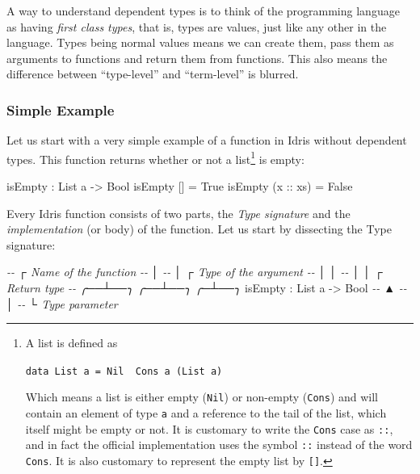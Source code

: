 \documentclass[
]{article}
\newenvironment{Shaded}{}{}
\newcommand{\CommentTok}[1]{\textcolor[rgb]{0.38,0.63,0.69}{\textit{#1}}}
\newcommand{\DataTypeTok}[1]{\textcolor[rgb]{0.56,0.13,0.00}{#1}}
\newcommand{\NormalTok}[1]{#1}
\newcommand{\OperatorTok}[1]{\textcolor[rgb]{0.40,0.40,0.40}{#1}}
\newcommand{\OtherTok}[1]{\textcolor[rgb]{0.00,0.44,0.13}{#1}}
\begin{document}
A way to understand dependent types is to think of the programming
language as having \emph{first class types}, that is, types are values,
just like any other in the language. Types being normal values means we
can create them, pass them as arguments to functions and return them
from functions. This also means the difference between ``type-level''
and ``term-level'' is blurred.

\hypertarget{simple-example}{%
\subsubsection{Simple Example}\label{simple-example}}

Let us start with a very simple example of a function in Idris without
dependent types. This function returns whether or not a list\footnote{A
  list is defined as

  \texttt{data\ List\ a\ =\ Nil\ \textbar{}\ Cons\ a\ (List\ a)}

  Which means a list is either empty (\texttt{Nil}) or non-empty
  (\texttt{Cons}) and will contain an element of type \texttt{a} and a
  reference to the tail of the list, which itself might be empty or not.
  It is customary to write the \texttt{Cons} case as \texttt{::}, and in
  fact the official implementation uses the symbol \texttt{::} instead
  of the word \texttt{Cons}. It is also customary to represent the empty
  list by \texttt{{[}{]}}.} is empty:

\begin{Shaded}
\begin{Highlighting}[]
\NormalTok{isEmpty }\OperatorTok{:} \DataTypeTok{List}\NormalTok{ a }\OtherTok{{-}\textgreater{}} \DataTypeTok{Bool}
\NormalTok{isEmpty [] }\OtherTok{=} \DataTypeTok{True}
\NormalTok{isEmpty (}\OtherTok{x ::}\NormalTok{ xs) }\OtherTok{=} \DataTypeTok{False}
\end{Highlighting}
\end{Shaded}

Every Idris function consists of two parts, the \emph{Type signature}
and the \emph{implementation} (or body) of the function. Let us start by
dissecting the Type signature:

\begin{Shaded}
\begin{Highlighting}[]
\CommentTok{{-}{-}    ┌ Name of the function}
\CommentTok{{-}{-}    │ }
\CommentTok{{-}{-}    │         ┌ Type of the argument }
\CommentTok{{-}{-}    │         │ }
\CommentTok{{-}{-}    │         │       ┌ Return type            }
\CommentTok{{-}{-} ╭──┴──╮   ╭──┴──╮  ╭─┴──╮}
\NormalTok{   isEmpty }\OperatorTok{:} \DataTypeTok{List}\NormalTok{ a }\OtherTok{{-}\textgreater{}} \DataTypeTok{Bool}
\CommentTok{{-}{-}                ▲}
\CommentTok{{-}{-}                │ }
\CommentTok{{-}{-}                └ Type parameter}
\end{Highlighting}
\end{Shaded}
\end{document}
